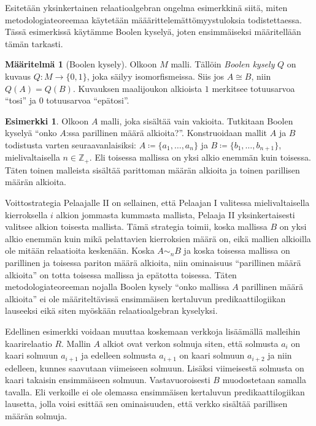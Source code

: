 \documentclass[finnish]{tktltiki2}
\theoremstyle{definition}
\newtheorem{maar}[lau]{Määritelmä}
\newtheorem{esim}[lau]{Esimerkki}
\theoremstyle{remark}
\begin{document}
Esitetään yksinkertainen relaatioalgebran ongelma esimerkkinä siitä, miten metodologiateoreemaa käytetään määärittelemättömyystuloksia todistettaessa. Tässä esimerkissä käytämme Boolen kyselyä, joten ensimmäiseksi määritellään tämän tarkasti.

\begin{maar}[Boolen kysely]
Olkoon $M$ malli. Tällöin \textit{Boolen kysely} $Q$ on kuvaus $Q: M \to \{0, 1\}$, joka säilyy isomorfismeissa. Siis jos $A \cong B$, niin $Q(A) = Q(B)$. Kuvauksen maalijoukon alkioista $1$ merkitsee totuusarvoa ``tosi'' ja $0$ totuusarvoa ``epätosi''.
\end{maar}

\begin{esim}
Olkoon $A$ malli, joka sisältää vain vakioita. Tutkitaan Boolen kyselyä ``onko $A$:ssa parillinen määrä alkioita?''. Konstruoidaan mallit $A$ ja $B$ todistusta varten seuraavanlaisiksi: $A \coloneqq \{a_1, \ldots, a_n\}$ ja $B \coloneqq \{b_1, \ldots, b_{n + 1}\}$, mielivaltaisella $n \in \mathbb{Z}_+$. Eli toisessa mallissa on yksi alkio enemmän kuin toisessa. Täten toinen malleista sisältää parittoman määrän alkioita ja toinen parillisen määrän alkioita.

Voittostrategia Pelaajalle II on sellainen, että Pelaajan I valitessa mielivaltaisella kierroksella $i$ alkion jommasta kummasta mallista, Pelaaja II yksinkertaisesti valitsee alkion toisesta mallista. Tämä strategia toimii, koska mallissa $B$ on yksi alkio enemmän kuin mikä pelattavien kierroksien määrä on, eikä mallien alkioilla ole mitään relaatioita keskenään. Koska $A \sim_n B$ ja koska toisessa mallissa on parillinen ja toisessa pariton määrä alkioita, niin ominaisuus ``parillinen määrä alkioita'' on totta toisessa mallissa ja epätotta toisessa. Täten metodologiateoreeman nojalla Boolen kysely ``onko mallissa $A$ parillinen määrä alkioita'' ei ole määriteltävissä ensimmäisen kertaluvun predikaattilogiikan lauseeksi eikä siten myöskään relaatioalgebran kyselyksi.
\end{esim}

Edellinen esimerkki voidaan muuttaa koskemaan verkkoja lisäämällä malleihin kaarirelaatio $R$. Mallin $A$ alkiot ovat verkon solmuja siten, että solmusta $a_i$ on kaari solmuun $a_{i + 1}$ ja edelleen solmusta $a_{i + 1}$ on kaari solmuun $a_{i + 2}$ ja niin edelleen, kunnes saavutaan viimeiseen solmuun. Lisäksi viimeisestä solmusta on kaari takaisin ensimmäiseen solmuun. Vastavuoroisesti $B$ muodostetaan samalla tavalla. Eli verkoille ei ole olemassa ensimmäisen kertaluvun predikaattilogiikan lausetta, jolla voisi esittää sen ominaisuuden, että verkko sisältää parillisen määrän solmuja.
\end{document}
